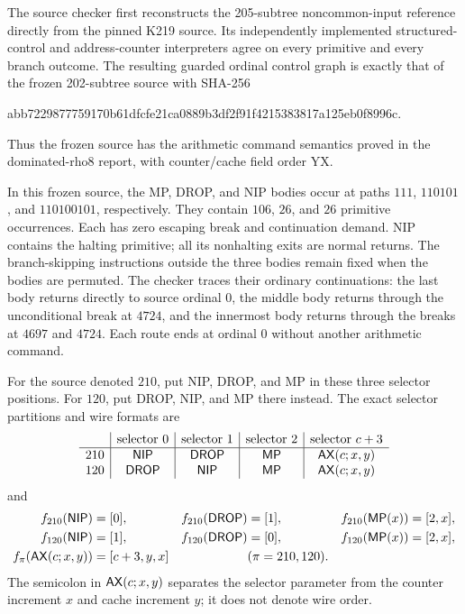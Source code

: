 The source checker first reconstructs the 205-subtree noncommon-input
reference directly from the pinned K219 source. Its independently
implemented structured-control and address-counter interpreters agree
on every primitive and every branch outcome. The resulting guarded
ordinal control graph is exactly that of the frozen 202-subtree source
with SHA-256
\begin{center}\ttfamily\footnotesize
abb7229877759170b61dfcfe21ca0889b3df2f91f4215383817a125eb0f8996c.
\end{center}
Thus the frozen source has the arithmetic command semantics proved in
the dominated-rho8 report, with counter/cache field order YX.

In this frozen source, the MP, DROP, and NIP bodies occur at paths
$111$, $110101$, and $110100101$, respectively. They contain
$106$, $26$, and $26$ primitive occurrences. Each has zero escaping
break and continuation demand. NIP contains the halting primitive;
all its nonhalting exits are normal returns. The branch-skipping
instructions outside the three bodies remain fixed when the bodies
are permuted. The checker traces their ordinary continuations: the
last body returns directly to source ordinal $0$, the middle body
returns through the unconditional break at $4724$, and the innermost
body returns through the breaks at $4697$ and $4724$. Each route ends
at ordinal $0$ without another arithmetic command.

For the source denoted $210$, put NIP, DROP, and MP in these three
selector positions. For $120$, put DROP, NIP, and MP there instead.
The exact selector partitions and wire formats are
\[
\begin{array}{c|c|c|c|c}
 &\text{selector }0&\text{selector }1&\text{selector }2
 &\text{selector }c+3\\\hline
210&\mathsf{NIP}&\mathsf{DROP}&\mathsf{MP}&\mathsf{AX}(c;x,y)\\
120&\mathsf{DROP}&\mathsf{NIP}&\mathsf{MP}&\mathsf{AX}(c;x,y)
\end{array}
\]
and
\begin{align*}
 f_{210}(\mathsf{NIP})&=[0],& f_{210}(\mathsf{DROP})&=[1],&
 f_{210}(\mathsf{MP}(x))&=[2,x],\\
 f_{120}(\mathsf{NIP})&=[1],& f_{120}(\mathsf{DROP})&=[0],&
 f_{120}(\mathsf{MP}(x))&=[2,x],\\
 f_\pi(\mathsf{AX}(c;x,y))&=[c+3,y,x]&& (\pi=210,120).
\end{align*}
The semicolon in $\mathsf{AX}(c;x,y)$ separates the selector parameter from
the counter increment $x$ and cache increment $y$; it does not denote
wire order.

